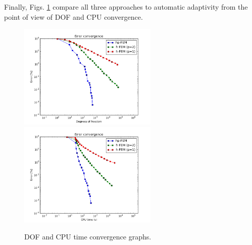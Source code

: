 Finally, Figs. \ref{fig:nist-6-conv} compare all
three approaches to automatic adaptivity from the point
of view of DOF and CPU convergence.

\begin{figure}[!ht]
\centering
\includegraphics[height=5cm]{nist/nist-6/conv_dof_aniso.png}\ \
\includegraphics[height=5cm]{nist/nist-6/conv_cpu_aniso.png}
\caption{DOF and CPU time convergence graphs.}
\label{fig:nist-6-conv}
\end{figure}

